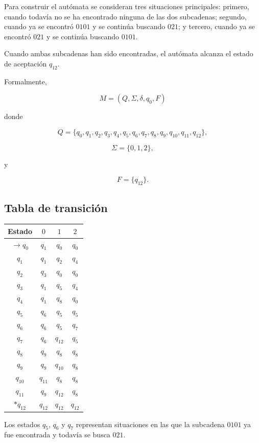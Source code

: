 \documentclass[12pt]{article}
\begin{document}
Para construir el autómata se consideran tres situaciones principales:
primero, cuando todavía no se ha encontrado ninguna de las dos
subcadenas; segundo, cuando ya se encontró $0101$ y se continúa buscando
$021$; y tercero, cuando ya se encontró $021$ y se continúa buscando
$0101$.

Cuando ambas subcadenas han sido encontradas, el autómata alcanza el
estado de aceptación $q_{12}$.

Formalmente,

\[
M=(Q,\Sigma,\delta,q_0,F)
\]

donde

\[
Q=\{q_0,q_1,q_2,q_3,q_4,q_5,q_6,q_7,
q_8,q_9,q_{10},q_{11},q_{12}\},
\]

\[
\Sigma=\{0,1,2\},
\]

y

\[
F=\{q_{12}\}.
\]

\subsection*{Tabla de transición}

\begin{center}
\begin{tabular}{c|ccc}
Estado & $0$ & $1$ & $2$ \\ \hline
$\rightarrow q_0$ & $q_1$ & $q_0$ & $q_0$ \\
$q_1$ & $q_1$ & $q_2$ & $q_4$ \\
$q_2$ & $q_3$ & $q_0$ & $q_0$ \\
$q_3$ & $q_1$ & $q_5$ & $q_4$ \\
$q_4$ & $q_1$ & $q_8$ & $q_0$ \\
$q_5$ & $q_6$ & $q_5$ & $q_5$ \\
$q_6$ & $q_6$ & $q_5$ & $q_7$ \\
$q_7$ & $q_6$ & $q_{12}$ & $q_5$ \\
$q_8$ & $q_9$ & $q_8$ & $q_8$ \\
$q_9$ & $q_9$ & $q_{10}$ & $q_8$ \\
$q_{10}$ & $q_{11}$ & $q_8$ & $q_8$ \\
$q_{11}$ & $q_9$ & $q_{12}$ & $q_8$ \\
$*q_{12}$ & $q_{12}$ & $q_{12}$ & $q_{12}$
\end{tabular}
\end{center}

Los estados $q_5$, $q_6$ y $q_7$ representan situaciones en las que
la subcadena $0101$ ya fue encontrada y todavía se busca $021$.
\end{document}

